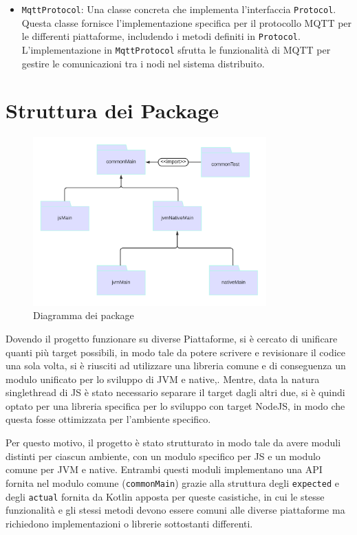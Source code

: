 \documentclass[12pt,a4paper,openright,twoside]{book}
\begin{document}
\begin{itemize}
    \item \texttt{MqttProtocol}: Una classe concreta che implementa l'interfaccia \texttt{Protocol}. Questa classe fornisce l'implementazione 
    specifica per il protocollo MQTT per le differenti piattaforme, includendo i metodi definiti in \texttt{Protocol}.
    L'implementazione in \texttt{MqttProtocol} sfrutta le funzionalità di \ac{MQTT} per gestire le comunicazioni tra i nodi nel sistema distribuito.

\end{itemize}


\section{Struttura dei Package}
\begin{figure}[h]
    \centering
    \includegraphics[width=0.8\textwidth]{figures/package-diagram.png}
    \caption{Diagramma dei package}
    \label{fig:diagramma-package}
\end{figure}

Dovendo il progetto funzionare su diverse Piattaforme, si è cercato di unificare quanti più target possibili, in modo tale da potere scrivere e revisionare il codice una sola volta,
si è riusciti ad utilizzare una libreria comune e di conseguenza un modulo unificato per lo sviluppo di \ac{JVM} e native,.
Mentre, data la natura singlethread di \ac{JS} è stato necessario separare il target dagli altri due, si è quindi optato per una libreria specifica 
per lo sviluppo con target NodeJS, in modo che questa fosse ottimizzata per l'ambiente specifico. 

Per questo motivo, il progetto è stato strutturato in modo tale da avere moduli distinti per ciascun ambiente, con un modulo specifico per \ac{JS} 
e un modulo comune per \ac{JVM} e native.  Entrambi questi moduli implementano una API fornita nel modulo comune (\texttt{commonMain}) grazie
alla struttura degli \texttt{expected} e degli \texttt{actual} fornita da Kotlin apposta per queste casistiche, in cui le stesse funzionalità
e gli stessi metodi devono essere comuni alle diverse piattaforme ma richiedono implementazioni o librerie sottostanti differenti.
\end{document}
